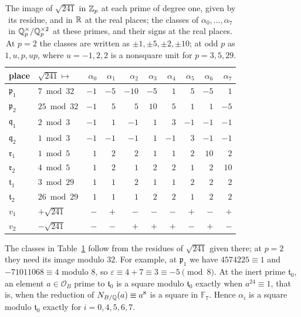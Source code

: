 \begin{table}[htbp]
\centering
\caption{The image of $\sqrt{241}$ in $\mathbb Z_p$ at each prime of degree one,
given by its residue, and in $\mathbb R$ at the real places; the classes of
$\alpha_0,\dots,\alpha_7$ in $\mathbb Q_p^\times/\mathbb Q_p^{\times2}$ at these primes, and
their signs at the real places. At $p=2$ the classes are written as
$\pm1,\pm5,\pm2,\pm10$; at odd $p$ as $1,u,p,up$, where $u=-1,2,2$ is a
nonsquare unit for $p=3,5,29$.}
\label{tw:squareclass-table}
\begin{tabular}{llrrrrrrrr}
\toprule
place & $\sqrt{241}\mapsto$ & $\alpha_0$ & $\alpha_1$ & $\alpha_2$ & $\alpha_3$ & $\alpha_4$ & $\alpha_5$ & $\alpha_6$ & $\alpha_7$\\
\midrule
$\mathfrak p_1$ & $7\bmod 32$ & $-1$ & $-5$ & $-10$ & $-5$ & $1$ & $5$ & $-5$ & $1$\\
$\mathfrak p_2$ & $25\bmod 32$ & $-1$ & $5$ & $5$ & $10$ & $5$ & $1$ & $1$ & $-5$\\
$\mathfrak q_1$ & $2\bmod 3$ & $-1$ & $1$ & $-1$ & $1$ & $3$ & $-1$ & $-1$ & $-1$\\
$\mathfrak q_2$ & $1\bmod 3$ & $-1$ & $-1$ & $-1$ & $1$ & $-1$ & $3$ & $-1$ & $-1$\\
$\mathfrak r_1$ & $1\bmod 5$ & $1$ & $2$ & $2$ & $1$ & $1$ & $2$ & $10$ & $2$\\
$\mathfrak r_2$ & $4\bmod 5$ & $1$ & $2$ & $1$ & $2$ & $2$ & $1$ & $2$ & $10$\\
$\mathfrak t_1$ & $3\bmod 29$ & $1$ & $1$ & $2$ & $1$ & $1$ & $2$ & $2$ & $2$\\
$\mathfrak t_2$ & $26\bmod 29$ & $1$ & $1$ & $1$ & $2$ & $2$ & $1$ & $2$ & $2$\\
$v_1$ & $+\sqrt{241}$ & $-$ & $+$ & $-$ & $-$ & $-$ & $+$ & $-$ & $+$\\
$v_2$ & $-\sqrt{241}$ & $-$ & $-$ & $+$ & $+$ & $+$ & $-$ & $+$ & $-$\\
\bottomrule
\end{tabular}
\end{table}

The classes in Table~\ref{tw:squareclass-table} follow from the residues of
$\sqrt{241}$ given there; at $p=2$ they need its image modulo $32$. For
example, at $\mathfrak p_1$ we have $4574225\equiv1$ and $-71011068\equiv4$
modulo $8$, so $\varepsilon\equiv4+7\equiv3\equiv-5\pmod 8$. At the inert
prime $\mathfrak t_0$, an element $a\in\mathcal O_B$ prime to $\mathfrak t_0$
is a square modulo $\mathfrak t_0$ exactly when $a^{24}\equiv1$, that is, when
the reduction of $N_{B/\mathbb Q}(a)\equiv a^8$ is a square in $\mathbb F_7$. Hence
$\alpha_i$ is a square modulo $\mathfrak t_0$ exactly for $i=0,4,5,6,7$.

